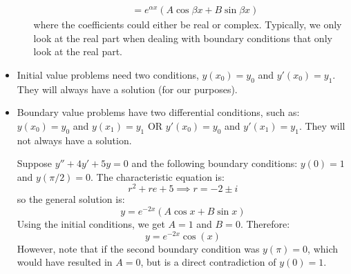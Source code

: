 \begin{itemize}
\begin{itemize}
\begin{align}
            &= e^{\alpha x}(A\cos\beta x + B\sin\beta x)
            \label{eq:}
        \end{align}
        where the coefficients could either be real or complex. Typically, we only look at the real part when dealing with boundary conditions that only look at the real part.
    \end{itemize}
    \item Initial value problems need two conditions, $y(x_0)=y_0$ and $y'(x_0)=y_1$. They will always have a solution (for our purposes).
    \item Boundary value problems have two differential conditions, such as: $y(x_0)=y_0$ and $y(x_1)=y_1$ OR $y'(x_0)=y_0$ and $y'(x_1)=y_1$. They will not always have a solution.
    \begin{example}
        Suppose $y''+4y'+5y=0$ and the following boundary conditions: $y(0)=1$ and $y(\pi/2)=0$. The characteristic equation is:
        \begin{equation}
            r^2+re+5 \implies r=-2\pm i
            \label{eq:}
        \end{equation}
        so the general solution is:
        \begin{equation}
            y = e^{-2x}\left(A\cos x+B\sin x\right)
            \label{eq:}
        \end{equation}
        Using the initial conditions, we get $A=1$ and $B=0$. Therefore:
        \begin{equation}
            y = e^{-2x}\cos(x)
            \label{eq:}
        \end{equation}
        However, note that if the second boundary condition was $y(\pi) = 0$, which would have resulted in $A=0$, but is a direct contradiction of $y(0)=1$.
    \end{example}
\end{itemize}
